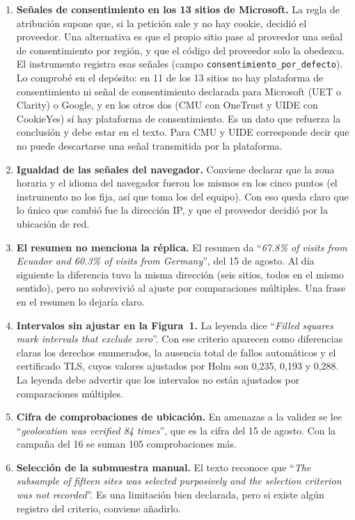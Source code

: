 \documentclass[11pt,a4paper]{article}
\newcommand{\cita}[1]{``\textit{#1}''}
\begin{document}
\begin{enumerate}
	\item \textbf{Se\~nales de consentimiento en los 13 sitios de Microsoft.} La regla de atribuci\'on supone que, si la petici\'on sale y no hay cookie, decidi\'o el proveedor. Una alternativa es que el propio sitio pase al proveedor una se\~nal de consentimiento por regi\'on, y que el c\'odigo del proveedor solo la obedezca. El instrumento registra esas se\~nales (campo \texttt{consentimiento\_por\_defecto}). Lo comprob\'e en el dep\'osito: en 11 de los 13 sitios no hay plataforma de consentimiento ni se\~nal de consentimiento declarada para Microsoft (UET o Clarity) o Google, y en los otros dos (CMU con OneTrust y UIDE con CookieYes) s\'i hay plataforma de consentimiento. Es un dato que refuerza la conclusi\'on y debe estar en el texto. Para CMU y UIDE corresponde decir que no puede descartarse una se\~nal transmitida por la plataforma.
	\item \textbf{Igualdad de las se\~nales del navegador.} Conviene declarar que la zona horaria y el idioma del navegador fueron los mismos en los cinco puntos (el instrumento no los fija, as\'i que toma los del equipo). Con eso queda claro que lo \'unico que cambi\'o fue la direcci\'on IP, y que el proveedor decidi\'o por la ubicaci\'on de red.
	\item \textbf{El resumen no menciona la r\'eplica.} El resumen da \cita{67.8\% of visits from Ecuador and 60.3\% of visits from Germany}, del 15 de agosto. Al d\'ia siguiente la diferencia tuvo la misma direcci\'on (seis sitios, todos en el mismo sentido), pero no sobrevivi\'o al ajuste por comparaciones m\'ultiples. Una frase en el resumen lo dejar\'ia claro.
	\item \textbf{Intervalos sin ajustar en la Figura~1.} La leyenda dice \cita{Filled squares mark intervals that exclude zero}. Con ese criterio aparecen como diferencias claras los derechos enumerados, la ausencia total de fallos autom\'aticos y el certificado TLS, cuyos valores ajustados por Holm son 0,235, 0,193 y 0,288. La leyenda debe advertir que los intervalos no est\'an ajustados por comparaciones m\'ultiples.
	\item \textbf{Cifra de comprobaciones de ubicaci\'on.} En amenazas a la validez se lee \cita{geolocation was verified 84 times}, que es la cifra del 15 de agosto. Con la campa\~na del 16 se suman 105 comprobaciones m\'as.
	\item \textbf{Selecci\'on de la submuestra manual.} El texto reconoce que \cita{The subsample of fifteen sites was selected purposively and the selection criterion was not recorded}. Es una limitaci\'on bien declarada, pero si existe alg\'un registro del criterio, conviene a\~nadirlo.

\end{enumerate}
\end{document}
